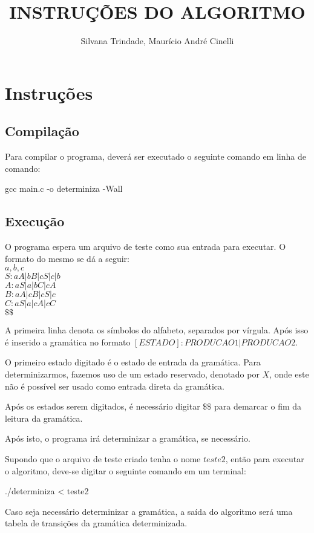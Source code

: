 \documentclass[10pt,a4paper,titlepage]{coursepaper}
\author{Silvana Trindade, Maurício André Cinelli}
\title{INSTRUÇÕES DO ALGORITMO}
\begin{document}
\maketitle

\section *{Instruções}

\subsection *{Compilação}

Para compilar o programa, deverá ser executado o seguinte comando em linha de comando:

\begin{center}
gcc main.c -o determiniza -Wall
\end{center}

\subsection *{Execução}

O programa espera um arquivo de teste como sua entrada para executar.
O formato do mesmo se dá a seguir:\\
$a,b,c$\\
$S:aA|bB|cS|c|b$\\
$A:aS|a|bC|cA$\\
$B:aA|cB|cS|c$\\
$C:aS|a|cA|cC$\\
$\$\$$


A primeira linha denota os símbolos do alfabeto, separados por vírgula.
Após isso é inserido a gramática no formato $[ESTADO]:PRODUCAO1|PRODUCAO2$.

O primeiro estado digitado é o estado de entrada da gramática.
Para determinizarmos, fazemos uso de um estado reservado, denotado por $X$, onde este não é possível ser usado como entrada direta da gramática.

Após os estados serem digitados, é necessário digitar $\$\$$ para demarcar o fim
da leitura da gramática.

Após isto, o programa irá determinizar a gramática, se necessário.

Supondo que o arquivo de teste criado tenha o nome $teste2$, então para executar o algoritmo, deve-se digitar o seguinte comando em um terminal:

\begin{center}
./determiniza < teste2
\end{center}

Caso seja necessário determinizar a gramática, a saída do algoritmo será uma tabela de transições da gramática determinizada.
\end{document}
